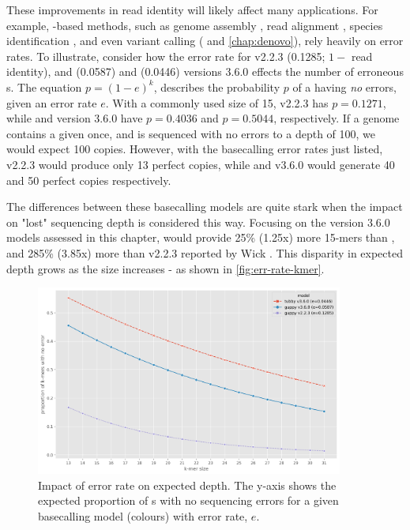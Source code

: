 These improvements in read identity will likely affect many applications. For example, \kmer{}-based methods, such as genome assembly \cite{koren2017}, read alignment \cite{li2018}, species identification \cite{Breitwieser2018}, and even variant calling (\cite{iqbal2012} and \autoref{chap:denovo}), rely heavily on error rates. To illustrate, consider how the error rate for \guppy{} v2.2.3 (0.1285; $1-$ read identity), and \guppy{} (0.0587) and \tubby{} (0.0446) versions 3.6.0 effects the number of erroneous \kmer{}s. The equation $p=(1-e)^k$, describes the probability $p$ of a \kmer{} having \emph{no} errors, given an error rate $e$. With a commonly used \ont{} \kmer{} size of 15, \guppy{} v2.2.3 has $p=0.1271$, while \guppy{} and \tubby{} version 3.6.0 have $p=0.4036$ and $p=0.5044$, respectively. If a genome contains a given \kmer{} once, and is sequenced with no errors to a depth of 100, we would expect 100 copies. However, with the \ont{} basecalling error rates just listed, \guppy{} v2.2.3 would produce only 13 perfect copies, while \guppy{} and \tubby{} v3.6.0 would generate 40 and 50 perfect copies respectively. 

The differences between these basecalling models are quite stark when the impact on "lost" sequencing depth is considered this way. Focusing on the version 3.6.0 models assessed in this chapter, \tubby{} would provide 25\% (1.25x)  more 15-mers than \guppy{}, and 285\% (3.85x) more than \guppy{} v2.2.3 reported by Wick \etal{}. This disparity in expected \kmer{} depth grows as the \kmer{} size increases - as shown in \autoref{fig:err-rate-kmer}.

\begin{figure}
\includegraphics[width=0.9\textwidth]{Chapter4/Figs/error_rate_k.png}
\centering
\caption{Impact of error rate on expected \kmer{} depth. The y-axis shows the expected proportion of \kmer{}s with no sequencing errors for a given basecalling model (colours) with error rate, $e$.}
\label{fig:err-rate-kmer}
\end{figure}

